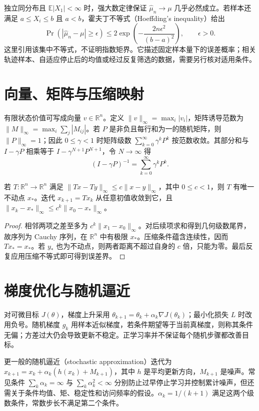 \documentclass[UTF8,12pt,a4paper,fontset=fandol]{ctexbook}
\begin{document}
独立同分布且 $\mathbb E|X_1|<\infty$ 时，强大数定律保证 $\widehat\mu_n\to\mu$ 几乎必然成立。若样本还满足 $a\leq X_i\leq b$ 且 $a<b$，霍夫丁不等式（Hoeffding's inequality）\cite{hoeffding}给出
\[
\Pr(|\widehat\mu_n-\mu|\geq\epsilon)
\leq2\exp\!\left(-\frac{2n\epsilon^2}{(b-a)^2}\right),\qquad \epsilon>0.
\]
这里引用该集中不等式，不证明指数矩界。它描述固定样本量下的误差概率；相关轨迹样本、自适应停止后的均值或经过反复筛选的数据，需要另行核对适用条件。

\section{向量、矩阵与压缩映射}

有限状态价值可写成向量 $v\in\mathbb R^n$。定义 $\|v\|_\infty=\max_i|v_i|$，矩阵诱导范数为 $\|M\|_\infty=\max_i\sum_j|M_{ij}|$。若 $P$ 是非负且每行和为一的随机矩阵，则 $\|P\|_\infty=1$；因此 $0\leq\gamma<1$ 时矩阵级数 $\sum_{k=0}^\infty\gamma^kP^k$ 按范数收敛。其部分和与 $I-\gamma P$ 相乘等于 $I-\gamma^{N+1}P^{N+1}$，令 $N\to\infty$ 得
\begin{equation}
(I-\gamma P)^{-1}=\sum_{k=0}^\infty\gamma^kP^k.
\label{eq:rl-matrix-inverse}
\end{equation}

\begin{theorem}[有限维压缩映射]
若 $T:\mathbb R^n\to\mathbb R^n$ 满足 $\|Tx-Ty\|_\infty\leq c\|x-y\|_\infty$，其中 $0\leq c<1$，则 $T$ 有唯一不动点 $x_*$。迭代 $x_{k+1}=Tx_k$ 从任意初值收敛到它，且 $\|x_k-x_*\|_\infty\leq c^k\|x_0-x_*\|_\infty$。
\end{theorem}
\begin{proof}
相邻两项之差至多为 $c^k\|x_1-x_0\|_\infty$。对后续项求和得到几何级数尾界，故序列为 Cauchy 序列，在 $\mathbb R^n$ 中有极限 $x_*$。压缩条件蕴含连续性，因而 $Tx_*=x_*$。若 $y_*$ 也为不动点，则两者距离不超过自身的 $c$ 倍，只能为零。最后反复应用压缩不等式即可得到误差界。
\end{proof}

\section{梯度优化与随机逼近}

对可微目标 $J(\theta)$，梯度上升采用 $\theta_{k+1}=\theta_k+\alpha_k\nabla J(\theta_k)$；最小化损失 $L$ 时改用负号。随机梯度 $g_k$ 用样本近似梯度，若条件期望等于当前真梯度，则称其条件无偏；方差过大仍会导致更新不稳定。正学习率并不保证每个随机步骤都改善目标。

更一般的随机逼近（stochastic approximation）迭代为 $x_{k+1}=x_k+\alpha_k(h(x_k)+M_{k+1})$，其中 $h$ 是平均更新方向，$M_{k+1}$ 是噪声。常见条件 $\sum_k\alpha_k=\infty$ 与 $\sum_k\alpha_k^2<\infty$ 分别防止过早停止学习并控制累计噪声，但还需关于条件均值、矩、稳定性和访问频率的假设。$\alpha_k=1/(k+1)$ 满足这两个级数条件，常数步长不满足第二个条件。
\end{document}
